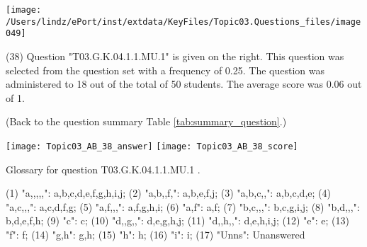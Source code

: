 \documentclass[12pt,english,nohyper]{tufte-handout}\usepackage[]{graphicx}\usepackage[]{color}
\begin{document}
\vspace{5cm}\begin{marginfigure}\texttt{[image: /Users/lindz/ePort/inst/extdata/KeyFiles/Topic03.Questions\_files/image049]}\end{marginfigure}\vspace{-5cm} (38) Question "T03.G.K.04.1.1.MU.1" is given on the right. This question was selected from the question set with a frequency of 0.25. The question was administered to 18 out of the total of 50 students. The average score was 0.06 out of 1.

 (Back to the question summary Table \ref{tab:summary_question}.)

\begin{center} \texttt{[image: Topic03\_AB\_38\_answer]} \texttt{[image: Topic03\_AB\_38\_score]} \end{center} 

Glossary for question T03.G.K.04.1.1.MU.1 .

(1) "a,,,,,": a,b,c,d,e,f,g,h,i,j; (2) "a,b,,f,": a,b,e,f,j; (3) "a,b,c,,": a,b,c,d,e; (4) "a,c,,,": a,c,d,f,g; (5) "a,f,,,": a,f,g,h,i; (6) "a,f": a,f; (7) "b,c,,,": b,c,g,i,j; (8) "b,d,,,": b,d,e,f,h; (9) "c": c; (10) "d,,g,,": d,e,g,h,j; (11) "d,,h,,": d,e,h,i,j; (12) "e": e; (13) "f": f; (14) "g,h": g,h; (15) "h": h; (16) "i": i; (17) "Unns": Unanswered
\end{document}
